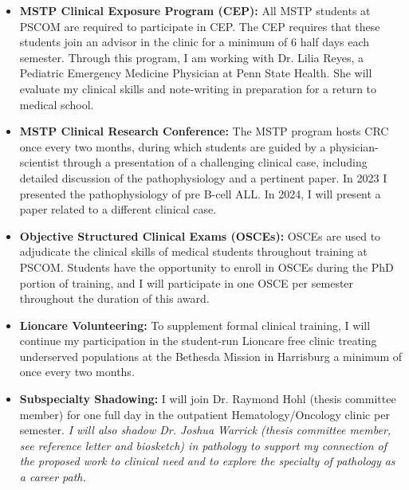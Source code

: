 \documentclass{NIHGrant}
\begin{document}
\begin{itemize}[leftmargin=*, nosep]
  \item \textbf{MSTP Clinical Exposure Program (CEP):} All MSTP students at PSCOM are required to participate in CEP. The CEP requires that these students join an advisor in the clinic for a minimum of 6 half days each semester. Through this program, I am working with Dr. Lilia Reyes, a Pediatric Emergency Medicine Physician at Penn State Health. She will evaluate my clinical skills and note-writing in preparation for a return to medical school.
  \item \textbf{MSTP Clinical Research Conference:} The MSTP program hosts CRC once every two months, during which students are guided by a physician-scientist through a presentation of a challenging clinical case, including detailed discussion of the pathophysiology and a pertinent paper. In 2023 I presented the pathophysiology of pre B-cell ALL. In 2024, I will present a paper related to a different clinical case.
  \item \textbf{Objective Structured Clinical Exams (OSCEs):} OSCEs are used to adjudicate the clinical skills of medical students throughout training at PSCOM. Students have the opportunity to enroll in OSCEs during the PhD portion of training, and I will participate in one OSCE per semester throughout the duration of this award.
  \item \textbf{Lioncare Volunteering:} To supplement formal clinical training, I will continue my participation in the student-run Lioncare free clinic treating underserved populations at the Bethesda Mission in Harrisburg a minimum of once every two months.
  \item \textbf{Subspecialty Shadowing:} I will join Dr. Raymond Hohl (thesis committee member) for one full day in the outpatient Hematology/Oncology clinic per semester. \emph{I will also shadow Dr. Joshua Warrick (thesis committee member, see reference letter and biosketch) in pathology to support my connection of the proposed work to clinical need and to explore the specialty of pathology as a career path.}
\end{itemize}
\end{document}

